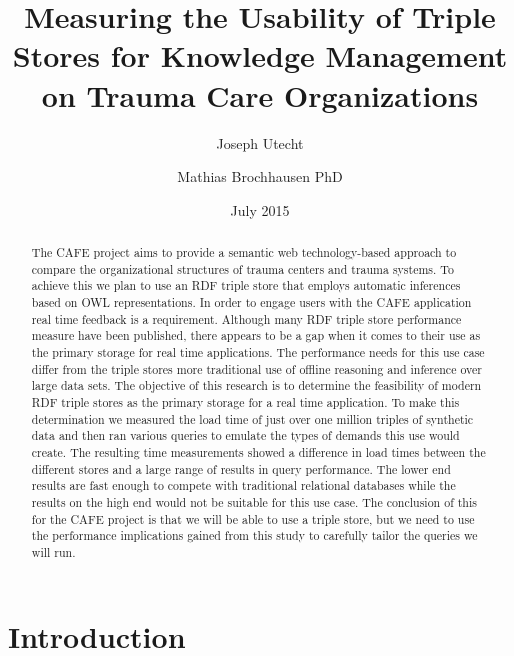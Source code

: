 \documentclass{llncs}
\title{Measuring the Usability of Triple Stores for Knowledge Management on Trauma Care Organizations}
\author{Joseph Utecht \and Mathias Brochhausen PhD}
\institute{Department of Biomedical Informatics, University of Arkansas for Medical Sciences, Little Rock, AR}
\date{July 2015}
\begin{document}
\maketitle

\begin{abstract}
The CAFE project aims to provide a semantic web technology-based approach to compare the organizational structures of trauma centers and trauma systems. To achieve this we plan to use an RDF triple store that employs automatic inferences based on OWL representations. In order to engage users with the CAFE application real time feedback is a requirement. Although many RDF triple store performance measure have been published, there appears to be a gap when it comes to their use as the primary storage for real time applications.  The performance needs for this use case differ from the triple stores more traditional use of offline reasoning and inference over large data sets. The objective of this research is to determine the feasibility of modern RDF triple stores as the primary storage for a real time application. To make this determination we measured the load time of just over one million triples of synthetic data and then ran various queries to emulate the types of demands this use would create. The resulting time measurements showed a difference in load times between the different stores and a large range of results in query performance.  The lower end results are fast enough to compete with traditional relational databases while the results on the high end would not be suitable for this use case. The conclusion of this for the CAFE project is that we will be able to use a triple store, but we need to use the performance implications gained from this study to carefully tailor the queries we will run.
\end{abstract}
\section{Introduction}
\end{document}
